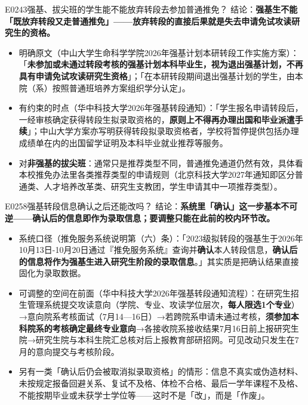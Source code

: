 \begin{qa}{E0243}{强基、拔尖班的学生能不能放弃转段去参加普通推免？}
结论：\textbf{强基生不能「既放弃转段又走普通推免」——放弃转段的直接后果就是失去申请免试攻读研究生的资格。}
\begin{itemize}
  \item 明确原文（中山大学生命科学学院2026年强基计划本研转段工作实施方案）：「\textbf{未参加或未通过转段考核的强基计划本科毕业生，视为退出强基计划，不再具有申请免试攻读研究生资格}」；「在本研转段期间退出强基计划的学生，由本院（系）按照普通班培养方案组织学分认定」。
  \item 有约束的时点（华中科技大学2026年强基转段通知）：「学生报名申请转段后，一经审核确定获得转段生拟录取资格的，\textbf{原则上不得再办理出国和毕业派遣手续}」；中山大学方案亦写明获得转段拟录取资格者，学校将暂停提供包括办理成绩单在内的出国留学证明及本科毕业就业推荐等服务。
  \item 对\textbf{非强基的拔尖班}：通常只是推荐类型不同，普通推免通道仍然有效，具体看本校推免办法里各类推荐类型的申请规则（北京科技大学2027年通知即区分普通类、人才培养改革类、研究生支教团，学生申请其中一项推荐类型）。
\end{itemize}
\end{qa}

\begin{qa}{E0258}{强基转段信息确认之后还能改吗？}
结论：\textbf{系统里「确认」这一步基本不可逆——确认后的信息即作为录取信息；要调整只能在此前的校内环节改。}
\begin{itemize}
  \item 系统口径（推免服务系统说明第（六）条）：「2023级拟转段的强基生于2026年10月13日-10月20日通过『推免服务系统』查询并\textbf{确认}本人转段信息，\textbf{确认后的信息将作为强基生进入研究生阶段的录取信息}。」其实质是把确认结果直接固化为录取数据。
  \item 可调整的空间在前面（华中科技大学2026年强基转段通知流程）：在研究生招生管理系统提交攻读意向（学院、专业、攻读学位层次，\textbf{每人限选1个专业}）→意向院系考核面试（7月14—16日）→若跨院系申请未通过考核，\textbf{须参加本科院系的考核确定最终专业意向}→各接收院系接收结果7月16日前上报研究生院→研究生院与本科生院汇总核对后上报教育部研招网。可见改动只发生在7月的意向提交与考核阶段。
  \item 另有一类「确认后仍会被取消拟录取资格」的情形：信息不真实或伪造材料、未按规定报备回避关系、复试不及格、体检不合格、最后一学年课程不及格、不能按期毕业或未获学士学位等——这时不是「改」，而是「作废」。
\end{itemize}
\end{qa}


